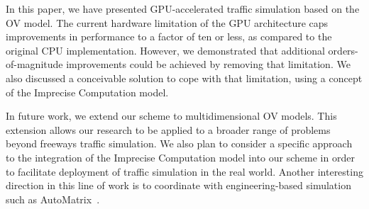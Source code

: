 \documentclass[times, 10pt, twocolumn]{article}
\begin{document}
In this paper, we have presented GPU-accelerated traffic simulation
based on the OV model.
The current hardware limitation of the GPU architecture caps
improvements in performance to a factor of ten or less, as compared to
the original CPU implementation.
However, we demonstrated that additional orders-of-magnitude
improvements could be achieved by removing that limitation.
We also discussed a conceivable solution to cope with that limitation,
using a concept of the Imprecise Computation model.

In future work, we extend our scheme to multidimensional OV models.
This extension allows our research to be applied to a broader range of
problems beyond freeways traffic simulation.
We also plan to consider a specific approach to the integration of the
Imprecise Computation model into our scheme in order to facilitate
deployment of traffic simulation in the real world.
Another interesting direction in this line of work is to coordinate with
engineering-based simulation such as AutoMatrix~\cite{Mangharam2011}.


{\footnotesize

}
\end{document}
